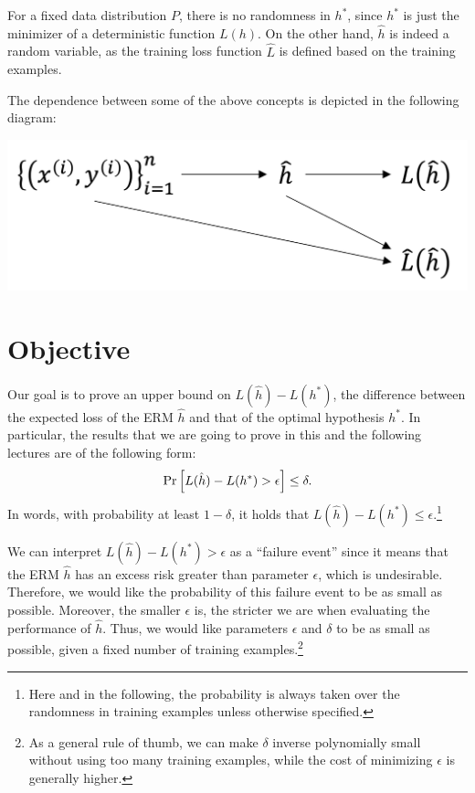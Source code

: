 \documentclass[11pt]{article}
\begin{document}
\begin{remark}\label{rem:dependence}
	For a fixed data distribution $P$, there is no randomness in $h^*$, since $h^*$ is just the minimizer of a deterministic function $L(h)$. On the other hand, $\hat h$ is indeed a random variable, as the training loss function $\hat L$ is defined based on the training examples.

	The dependence between some of the above concepts is depicted in the following diagram:
	\begin{center}
		\includegraphics[scale=0.4]{1.png}
	\end{center}
\end{remark}

\section{Objective}
Our goal is to prove an upper bound on $L(\hat h) - L(h^*)$, the difference between the expected loss of the ERM $\hat h$ and that of the optimal hypothesis $h^*$. In particular, the results that we are going to prove in this and the following lectures are of the following form:
\begin{equation*}
	\Pr_{}\left[L(\hat h) - L(h^*) > \epsilon\right] \le \delta.
\end{equation*}
In words, with probability at least $1 - \delta$, it holds that $L(\hat h) - L(h^*) \le \epsilon$.\footnote{Here and in the following, the probability is always taken over the randomness in training examples unless otherwise specified.}

We can interpret $L(\hat h) - L(h^*) > \epsilon$ as a ``failure event'' since it means that the ERM $\hat h$ has an excess risk greater than parameter $\epsilon$, which is undesirable. Therefore, we would like the probability of this failure event to be as small as possible. Moreover, the smaller $\epsilon$ is, the stricter we are when evaluating the performance of $\hat h$. Thus, we would like parameters $\epsilon$ and $\delta$ to be as small as possible, given a fixed number of training examples.\footnote{As a general rule of thumb, we can make $\delta$ inverse polynomially small without using too many training examples, while the cost of minimizing $\epsilon$ is generally higher.}
\end{document}
